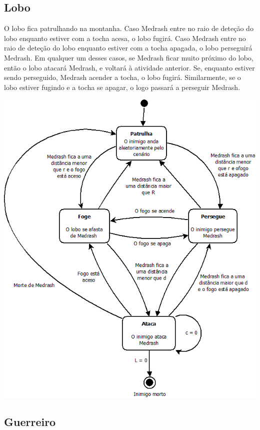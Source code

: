 \subsection{Lobo}

O lobo fica patrulhando na montanha. Caso Medrash entre no raio de
deteção do lobo enquanto estiver com a tocha acesa, o lobo fugirá. Caso
Medrash entre no raio de deteção do lobo enquanto estiver com a tocha
apagada, o lobo perseguirá Medrash. Em qualquer um desses casos, se
Medrash ficar muito próximo do lobo, então o lobo atacará Medrash, e
voltará à atividade anterior.
Se, enquanto estiver sendo perseguido, Medrash acender a tocha,
o lobo fugirá. Similarmente, se o lobo estiver fugindo e a tocha se apagar,
o logo passará a perseguir Medrash.

\begin{center}
 \includegraphics[scale=0.5]{ia_lobo.png}
\end{center}

\subsection{Guerreiro}

